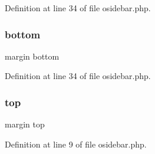 Definition at line 34 of file osidebar.\+php.

\mbox{\label{osidebar_8php_a9034efd9266ed643f35aa86e8ca32ac2}} 
\subsubsection{\texorpdfstring{bottom}{bottom}}
{\footnotesize\ttfamily margin bottom}



Definition at line 34 of file osidebar.\+php.

\mbox{\label{osidebar_8php_a92a4f9c60f5fc724a2e9a4fdb35e9777}} 
\subsubsection{\texorpdfstring{top}{top}}
{\footnotesize\ttfamily margin top}



Definition at line 9 of file osidebar.\+php.

